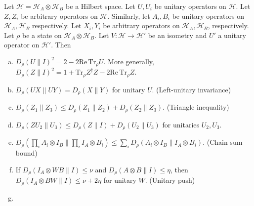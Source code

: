 \begin{lemma}\label{lemma:state-dependent-distance}
	Let $\mathcal{H} = \mathcal{H}_A\otimes \mathcal{H}_B$ be a Hilbert space. Let $U,U_i$ be unitary operators on $\mathcal{H}$. Let $Z,Z_i$ be arbitrary operators on $\mathcal{H}$. Similarly, let $A_i, B_i$ be unitary operators on $\mathcal{H}_A, \mathcal{H}_B$ respectively. Let $X_i, Y_i$ be arbitrary operators on $\mathcal{H}_A, \mathcal{H}_B$, respectively.
	Let $\rho$ be a state on $\mathcal{H}_A\otimes \mathcal{H}_B$. Let $V: \mathcal{H}\to \mathcal{H}'$ be an isometry and $U'$ a unitary operator on $\mathcal{H}'$. Then
	\begin{enumerate}[(a)]
		\item
		\label{item:state-dependent-distance-square}
		$D_\rho(U \| I)^2 =2 - 2\mathrm{Re}\,\mathrm{Tr}_\rho U$. More generally, $D_\rho(Z \| I)^2 = 1 + \mathrm{Tr}_\rho Z^\dagger Z - 2\mathrm{Re}\,\mathrm{Tr}_\rho Z$.
		\item
		\label{item:state-dependent-distance-inverse}
		$D_\rho(UX \| UY) = D_\rho(X \| Y)$ for unitary $U$. (Left-unitary invariance)
		\item\label{item:state-dependent-distance-triangle}
		$D_\rho(Z_1 \| Z_3) \leq D_\rho(Z_1 \| Z_2) + D_\rho(Z_2 \| Z_3)$. (Triangle inequality)
		\item\label{item:state-dependent-distance-right-multiplication}
		$D_\rho(ZU_2 \| U_3) \leq D_\rho(Z \| I) + D_\rho(U_2 \| U_3)$ for unitaries $U_2, U_3$.
		\item\label{item:state-dependent-distance-chaining}
		$D_\rho(\prod_{i}A_i\otimes I_B \| \prod_{i}I_A \otimes B_i) \leq \sum_i D_\rho(A_i\otimes I_B \| I_A\otimes B_i)$. (Chain sum bound)
		\item\label{item:state-dependent-distance-conjugation}
		If $D_\rho(I_A\otimes WB \| I) \leq \nu$ and $D_\rho(A\otimes B \| I)\leq \eta$, then $D_\rho(I_A\otimes BW \| I)\leq \nu + 2\eta$ for unitary $W$. (Unitary push)
		\item\label{item:state-dependent-distance-jensen}

\end{enumerate}
\end{lemma}
